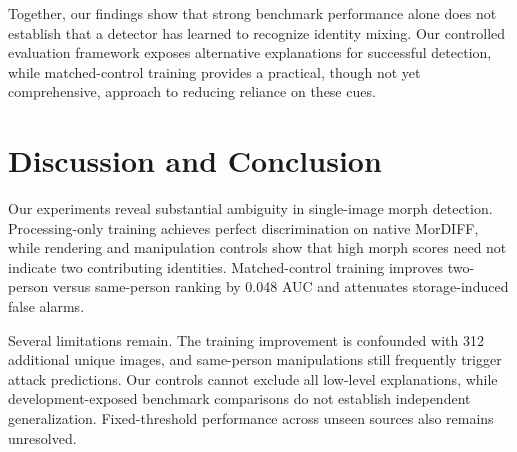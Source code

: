 \documentclass[10pt,twocolumn,letterpaper]{article}
\begin{document}
Together, our findings show that strong benchmark performance alone does not establish that a detector has learned to recognize identity mixing. Our controlled evaluation framework exposes alternative explanations for successful detection, while matched-control training provides a practical, though not yet comprehensive, approach to reducing reliance on these cues.


%



%




\section{Discussion and Conclusion}

Our experiments reveal substantial ambiguity in
single-image morph detection. Processing-only training
achieves perfect discrimination on native MorDIFF,
while rendering and manipulation controls show that
high morph scores need not indicate two contributing
identities. Matched-control training improves
two-person versus same-person ranking by 0.048 AUC
and attenuates storage-induced false alarms.

Several limitations remain. The training improvement
is confounded with 312 additional unique images,
and same-person manipulations still frequently trigger
attack predictions. Our controls cannot exclude all
low-level explanations, while development-exposed
benchmark comparisons do not establish independent
generalization. Fixed-threshold performance across
unseen sources also remains unresolved.
\end{document}
